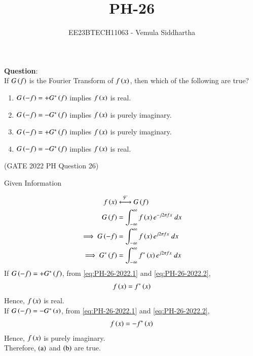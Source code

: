 \documentclass[journal,12pt,twocolumn]{IEEEtran}
\theoremstyle{remark}
\begin{document}

\vspace{3cm}

\title{PH-26}
\author{EE23BTECH11063 - Vemula Siddhartha}
\maketitle
\newpage
\bigskip

\renewcommand{\thefigure}{\theenumi}
\renewcommand{\thetable}{\theenumi}
\textbf{Question}:\\
If $G\left(f\right)$ is the Fourier Transform of $f\left(x\right)$, then which of the following are true?
\begin{enumerate}[label=(\alph*)]
    \item $G\left(-f\right)=+G^*\left(f\right)$ implies $f\left(x\right)$ is real.
    \item $G\left(-f\right)=-G^*\left(f\right)$ implies $f\left(x\right)$ is purely imaginary.
    \item $G\left(-f\right)=+G^*\left(f\right)$ implies $f\left(x\right)$ is purely imaginary.
    \item $G\left(-f\right)=-G^*\left(f\right)$ implies $f\left(x\right)$ is real.
\end{enumerate}
\hfill(GATE 2022 PH Question 26)\\
\solution
\begin{table}[h!]    
    \centering
    
    \caption{Given Information}
  \end{table}
\begin{align}
    f\brak{x} &\system{F} G\brak{f} \\
    G\brak{f} &= \int_{-\infty}^{\infty} f\brak{x} e^{-j 2 \pi f x}\;dx \\
    \implies G\brak{-f} &= \int_{-\infty}^{\infty} f\brak{x} e^{j 2 \pi f x}\; dx \label{eq:PH-26-2022.1} \\
    \implies G^*\brak{f} &= \int_{-\infty}^{\infty} f^*\brak{x} e^{j 2 \pi f x}\; dx \label{eq:PH-26-2022.2}
\end{align}
If $G\left(-f\right) = + G^*\left(f\right)$, from \eqref{eq:PH-26-2022.1} and \eqref{eq:PH-26-2022.2},
\begin{align}
    f\left(x\right) = f^*\left(x\right)
\end{align}
Hence, $f\left(x\right)$ is real. \\
If $G\left(-f\right) = - G^*\left(s\right)$, from \eqref{eq:PH-26-2022.1} and \eqref{eq:PH-26-2022.2},
\begin{align}
    f\left(x\right) = -f^*\left(x\right)
\end{align}
Hence, $f\left(x\right)$ is purely imaginary. \\
Therefore, $\left(\text{a}\right)$ and $\left(\text{b}\right)$ are true.
\end{document}
